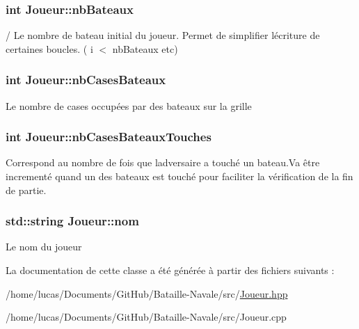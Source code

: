 \subsubsection[{\texorpdfstring{nb\+Bateaux}{nbBateaux}}]{\setlength{\rightskip}{0pt plus 5cm}int Joueur\+::nb\+Bateaux\hspace{0.3cm}{\ttfamily [protected]}}\hypertarget{class_joueur_a56752b0a96da94b17b07fd0312035a13}{}\label{class_joueur_a56752b0a96da94b17b07fd0312035a13}
/ Le nombre de bateau initial du joueur. Permet de simplifier l\textquotesingle{}écriture de certaines boucles. ( i $<$ nb\+Bateaux etc) 
\subsubsection[{\texorpdfstring{nb\+Cases\+Bateaux}{nbCasesBateaux}}]{\setlength{\rightskip}{0pt plus 5cm}int Joueur\+::nb\+Cases\+Bateaux\hspace{0.3cm}{\ttfamily [protected]}}\hypertarget{class_joueur_a29e4485fe7b0a3f2c962757b7c7bf2a5}{}\label{class_joueur_a29e4485fe7b0a3f2c962757b7c7bf2a5}
Le nombre de cases occupées par des bateaux sur la grille 
\subsubsection[{\texorpdfstring{nb\+Cases\+Bateaux\+Touches}{nbCasesBateauxTouches}}]{\setlength{\rightskip}{0pt plus 5cm}int Joueur\+::nb\+Cases\+Bateaux\+Touches\hspace{0.3cm}{\ttfamily [protected]}}\hypertarget{class_joueur_a3a41069191547937ddd3acd15eecd4ee}{}\label{class_joueur_a3a41069191547937ddd3acd15eecd4ee}
Correspond au nombre de fois que l\textquotesingle{}adversaire a touché un bateau.\+Va être incrementé quand un des bateaux est touché pour faciliter la vérification de la fin de partie. 
\subsubsection[{\texorpdfstring{nom}{nom}}]{\setlength{\rightskip}{0pt plus 5cm}std\+::string Joueur\+::nom\hspace{0.3cm}{\ttfamily [protected]}}\hypertarget{class_joueur_abaee0b4f259181bf66dbab54bef971bb}{}\label{class_joueur_abaee0b4f259181bf66dbab54bef971bb}
Le nom du joueur 

La documentation de cette classe a été générée à partir des fichiers suivants \+:\begin{DoxyCompactItemize}
\item 
/home/lucas/\+Documents/\+Git\+Hub/\+Bataille-\/\+Navale/src/\hyperlink{_joueur_8hpp}{Joueur.\+hpp}\item 
/home/lucas/\+Documents/\+Git\+Hub/\+Bataille-\/\+Navale/src/Joueur.\+cpp\end{DoxyCompactItemize}
